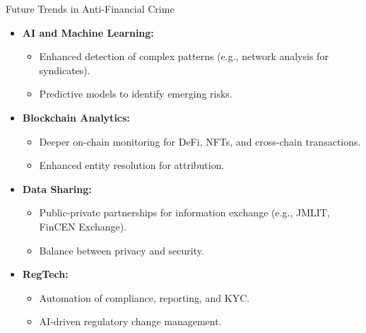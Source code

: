 \documentclass{beamer}
\begin{document}
	\begin{frame}{Future Trends in Anti-Financial Crime}
		\begin{itemize}
			\item \textbf{AI and Machine Learning:}
			\begin{itemize}
				\item Enhanced detection of complex patterns (e.g., network analysis for syndicates).
				\item Predictive models to identify emerging risks.
			\end{itemize}
			\item \textbf{Blockchain Analytics:}
			\begin{itemize}
				\item Deeper on-chain monitoring for DeFi, NFTs, and cross-chain transactions.
				\item Enhanced entity resolution for attribution.
			\end{itemize}
			\item \textbf{Data Sharing:}
			\begin{itemize}
				\item Public-private partnerships for information exchange (e.g., JMLIT, FinCEN Exchange).
				\item Balance between privacy and security.
			\end{itemize}
			\item \textbf{RegTech:}
			\begin{itemize}
				\item Automation of compliance, reporting, and KYC.
				\item AI-driven regulatory change management.
			\end{itemize}
		\end{itemize}
	\end{frame}
	
\end{document}
